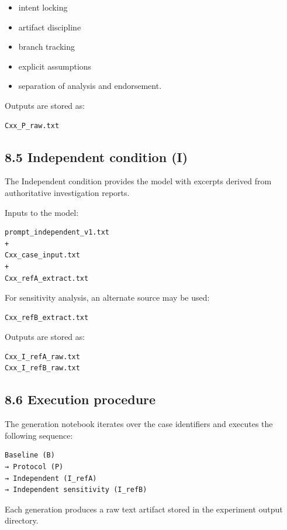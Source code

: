 {\begin{itemize}
\item intent locking
\item artifact discipline
\item branch tracking
\item explicit assumptions
\item separation of analysis and endorsement.
\end{itemize}

Outputs are stored as:

\begin{verbatim}
Cxx_P_raw.txt
\end{verbatim}

\subsection*{8.5 Independent condition (I)}

The Independent condition provides the model with excerpts derived from authoritative investigation reports.

Inputs to the model:

\begin{verbatim}
prompt_independent_v1.txt
+
Cxx_case_input.txt
+
Cxx_refA_extract.txt
\end{verbatim}

For sensitivity analysis, an alternate source may be used:

\begin{verbatim}
Cxx_refB_extract.txt
\end{verbatim}

Outputs are stored as:

\begin{verbatim}
Cxx_I_refA_raw.txt
Cxx_I_refB_raw.txt
\end{verbatim}

\subsection*{8.6 Execution procedure}

The generation notebook iterates over the case identifiers and executes the following sequence:

\begin{verbatim}
Baseline (B)
→ Protocol (P)
→ Independent (I_refA)
→ Independent sensitivity (I_refB)
\end{verbatim}

Each generation produces a raw text artifact stored in the experiment output directory.

}
